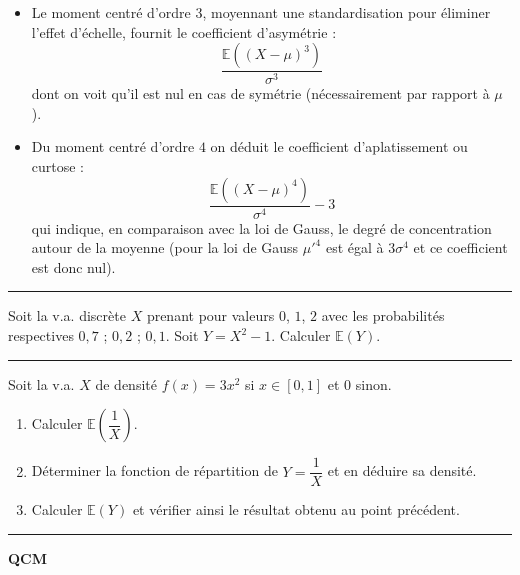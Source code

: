 \documentclass[../PolyS4.tex]{subfiles}
\begin{document}
\begin{Rmq}
\begin{itemize}
\item Le moment centré d'ordre $3$, moyennant une standardisation pour éliminer
l'effet d'échelle, fournit le coefficient d'asymétrie :
$$\dfrac{\mathbb{E}((X - \mu)^3)}{\sigma^3}$$
dont on voit qu'il est nul en cas de symétrie (nécessairement par rapport à $\mu$ ).
\item Du moment centré d'ordre $4$ on déduit le coefficient d'aplatissement ou
curtose :
$$\dfrac{\mathbb{E}((X - \mu)^4)}{\sigma^4}- 3$$
qui indique, en comparaison avec la loi de Gauss, le degré de concentration
autour de la moyenne (pour la loi de Gauss $\mu'^4$ est égal  à $3\sigma^4$ et ce coefficient
est donc nul).\\
\end{itemize}
\end{Rmq}

\vspace{1em}
\hrule
\vspace{1em}


Soit la v.a. discrète $X$ prenant pour valeurs $0$, $1$, $2$ avec les probabilités respectives $0,7$ ; $0,2$ ; $0,1$. Soit $Y = X^2 - 1$. Calculer $\mathbb{E}(Y)$.

\vspace{1em}
\hrule
\vspace{1em}




Soit la v.a. $X$ de densité $f(x) = 3x^2$ si $x \in [0, 1]$ et $0$ sinon.

\begin{enumerate}
\item Calculer $\mathbb{E}\left(\dfrac{1}{X}\right)$.
\item Déterminer la fonction de répartition de $Y = \dfrac{1}{X}$ et en déduire sa densité.
\item Calculer $\mathbb{E}(Y)$ et vérifier ainsi le résultat obtenu au point précédent.
\end{enumerate}

\vspace{1em}
\hrule
\vspace{1em}

\textbf*{QCM}
\end{document}
